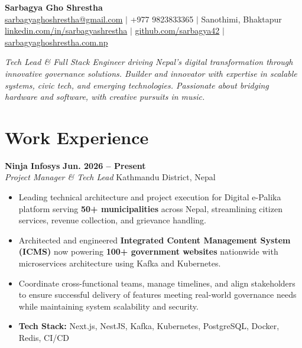 \documentclass[11pt,a4paper]{article}
\begin{document}
{\centering
{\LARGE\textbf{Sarbagya Gho Shrestha}}\\[8pt]
\href{mailto:sarbagyaghoshrestha@gmail.com}{sarbagyaghoshrestha@gmail.com} $|$
+977 9823833365 $|$
Sanothimi, Bhaktapur\\
\href{https://linkedin.com/in/sarbagyashrestha}{linkedin.com/in/sarbagyashrestha} $|$
\href{https://github.com/sarbagya42}{github.com/sarbagya42} $|$
\href{https://sarbagyaghoshrestha.com.np}{sarbagyaghoshrestha.com.np}\\[10pt]
}

\textit{Tech Lead \& Full Stack Engineer driving Nepal's digital transformation through innovative governance solutions. Builder and innovator with expertise in scalable systems, civic tech, and emerging technologies. Passionate about bridging hardware and software, with creative pursuits in music.}\\

\section*{Work Experience}

\textbf{Ninja Infosys} \hfill \textbf{Jun. 2026 -- Present}\\
\textit{Project Manager \& Tech Lead} \hfill Kathmandu District, Nepal\\[-6pt]
\begin{itemize}[leftmargin=*, itemsep=2pt, topsep=4pt]
    \item Leading technical architecture and project execution for Digital e-Palika platform serving \textbf{50+ municipalities} across Nepal, streamlining citizen services, revenue collection, and grievance handling.
    \item Architected and engineered \textbf{Integrated Content Management System (ICMS)} now powering \textbf{100+ government websites} nationwide with microservices architecture using Kafka and Kubernetes.
    \item Coordinate cross-functional teams, manage timelines, and align stakeholders to ensure successful delivery of features meeting real-world governance needs while maintaining system scalability and security.
    \item \textbf{Tech Stack:} Next.js, NestJS, Kafka, Kubernetes, PostgreSQL, Docker, Redis, CI/CD
\end{itemize}
\end{document}
